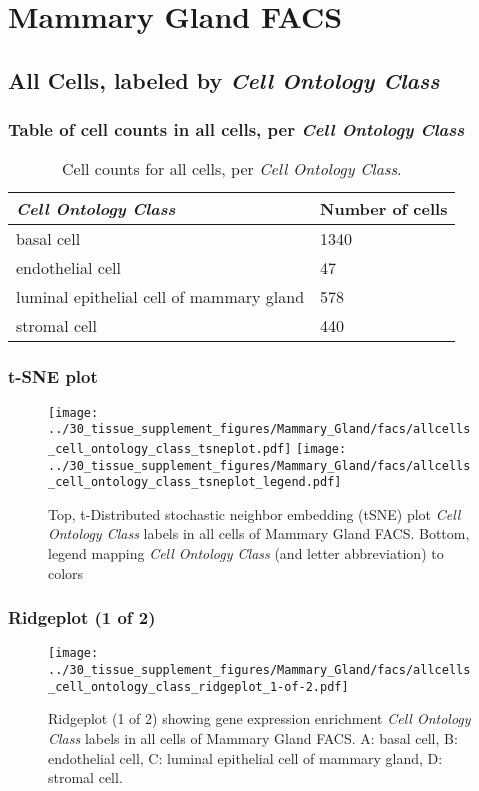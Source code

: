 \clearpage
\section{Mammary Gland FACS}

\subsection{All Cells, labeled by \emph{Cell Ontology Class}}
\subsubsection{Table of cell counts in all cells, per \emph{Cell Ontology Class}}\begin{table}[h]
\centering
\label{my-label}
\begin{tabular}{@{}ll@{}}
\toprule

\emph{Cell Ontology Class}& Number of cells \\ \midrule
basal cell & 1340 \\

endothelial cell & 47 \\

luminal epithelial cell of mammary gland & 578 \\

stromal cell & 440 \\
\bottomrule
\end{tabular}
\caption{Cell counts for all cells, per \emph{Cell Ontology Class}.}
\end{table}

\clearpage
\subsubsection{t-SNE plot}
\begin{figure}[h]
\centering
\texttt{[image: ../30\_tissue\_supplement\_figures/Mammary\_Gland/facs/allcells\_cell\_ontology\_class\_tsneplot.pdf]}
\texttt{[image: ../30\_tissue\_supplement\_figures/Mammary\_Gland/facs/allcells\_cell\_ontology\_class\_tsneplot\_legend.pdf]}
\caption{Top, t-Distributed stochastic neighbor embedding (tSNE) plot  \emph{Cell Ontology Class} labels in all cells of Mammary Gland FACS. Bottom, legend mapping \emph{Cell Ontology Class} (and letter abbreviation) to colors}
\end{figure}


\clearpage

\subsubsection{Ridgeplot (1 of 2)}
\begin{figure}[h]
\centering
\texttt{[image: ../30\_tissue\_supplement\_figures/Mammary\_Gland/facs/allcells\_cell\_ontology\_class\_ridgeplot\_1-of-2.pdf]}

\caption{ Ridgeplot (1 of 2)  showing gene expression enrichment \emph{Cell Ontology Class} labels in all cells of Mammary Gland FACS. A: basal cell, B: endothelial cell, C: luminal epithelial cell of mammary gland, D: stromal cell.}
\end{figure}


